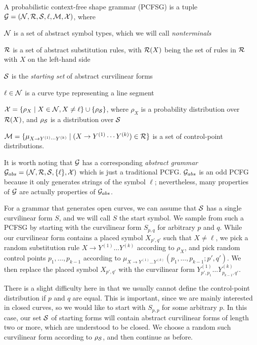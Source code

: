 \documentclass{article}
\begin{document}
\begin{defn}
A probabilistic context-free shape grammar (PCFSG) is a tuple 
${\mathcal G} = ({\mathcal N}, {\mathcal R}, {\mathcal S}, \ell, {\mathcal M}, {\mathcal X})$, where
\bitem
\item ${\mathcal N}$ is a set of abstract symbol types, which we will call
  {\em nonterminals}
\item ${\mathcal R}$ is a set of abstract substitution rules, with ${\mathcal R}(X)$
  being the set of rules in ${\mathcal R}$ with $X$ on the left-hand side
\item ${\mathcal S}$ is the {\em starting set} of abstract curvilinear forms
\item $\ell \in {\mathcal N}$ is a curve type representing a line segment
\item ${\mathcal X} = \{ \rho_X \mid X\in {\mathcal N}, X\ne \ell \} \cup
  \{\rho_{\mathcal S}\}$, where $\rho_X$ is a probability distribution over
  ${\mathcal R}(X)$, and $\rho_{\mathcal S}$ is a distribution over ${\mathcal S}$
\item ${\mathcal M} = \{ \mu_{X\to Y^{(1)}\cdots Y^{(k)}} \mid (X\to
  Y^{(1)}\cdots Y^{(k)}) \in {\mathcal R}\}$ is a set of control-point
  distributions.
\eitem
\end{defn}

It is worth noting that ${\mathcal G}$ has a corresponding {\em abstract
  grammar} ${\mathcal G}_{abs} = ({\mathcal N}, {\mathcal R}, {\mathcal S}, \{\ell\}, {\mathcal X})$ which is
just a traditional PCFG. ${\mathcal G}_{abs}$ is an odd PCFG because it only
generates strings of the symbol $\ell$; nevertheless, many properties
of ${\mathcal G}$ are actually properties of ${\mathcal G}_{abs}$.

For a grammar that generates open curves, we can assume that ${\mathcal S}$
has a single curvilinear form $S$, and we will call $S$ the start
symbol. We sample from such a PCFSG by starting with the curvilinear
form $S_{p,q}$ for arbitrary $p$ and $q$. While our curvilinear form
contains a placed symbol $X_{p',q'}$ such that $X\ne \ell$, we pick a
random substitution rule $X \to Y^{(1)} \dots Y^{(k)}$ according to
$\rho_X$, and pick random control points $p_1,\dots, p_{k-1}$
according to $\mu_{X\to Y^{(1)}\dots Y^{(k)}}(p_1, \dots, p_{k-1}; p',
q')$. We then replace the placed symbol $X_{p',q'}$ with the
curvilinear form $Y_{p',p_1}^{(1)} \dots Y_{p_{k-1},q'}^{(k)}$.

There is a slight difficulty here in that we usually cannot define the
control-point distribution if $p$ and $q$ are equal. This is
important, since we are mainly interested in closed curves, so we
would like to start with $S_{p,p}$ for some arbitrary $p$. In this
case, our set ${\mathcal S}$ of starting forms will contain abstract
curvilinear forms of length two or more, which are understood to be
closed. We choose a random such curvilinear form according to
$\rho_{\mathcal S}$, and then continue as before.
\end{document}
